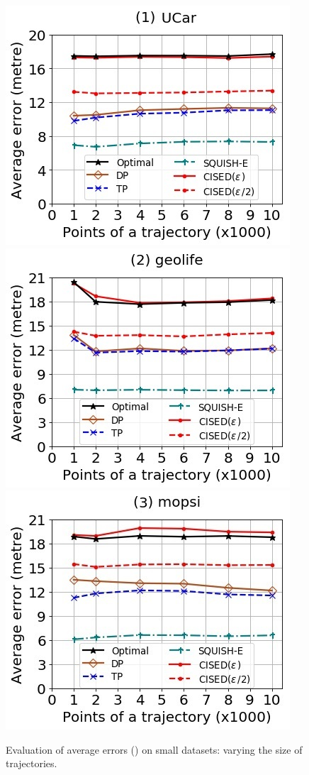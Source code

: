 \begin{figure}[tb!]
	\centering
	\includegraphics[scale=0.500]{Figures/Exp-SED-error-size-service.jpg} 	\hspace{2ex}
	\includegraphics[scale=0.500]{Figures/Exp-SED-error-size-geolife.jpg}	\hspace{2ex}
	\includegraphics[scale=0.500]{Figures/Exp-SED-error-size-mopsi.jpg}		
	\vspace{-2ex}
	\caption{\small Evaluation of average errors (\sed) on small datasets: varying the size of
		trajectories.}
	\label{fig:ae-sed-size}
	\vspace{-2ex}
\end{figure}



